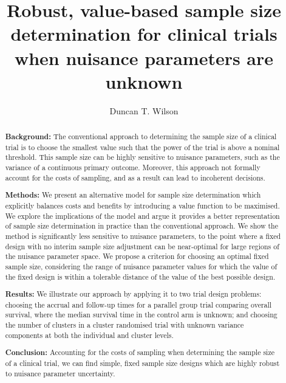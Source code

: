 \documentclass[sagev, Crown]{sagej}
\begin{document}

\title{Robust, value-based sample size determination for clinical trials when nuisance parameters are unknown}

\author{Duncan T. Wilson}%



\begin{abstract}

\textbf{Background:} The conventional approach to determining the sample size of a clinical trial is to choose the smallest value such that the power of the trial is above a nominal threshold. This sample size can be highly sensitive to nuisance parameters, such as the variance of a continuous primary outcome. Moreover, this approach not formally account for the costs of sampling, and as a result can lead to incoherent decisions.

\textbf{Methods:} We present an alternative model for sample size determination which explicitly balances costs and benefits by introducing a value function to be maximised. We explore the implications of the model and argue it provides a better representation of sample size determination in practice than the conventional approach. We show the method is significantly less sensitive to nuisance parameters, to the point where a fixed design with no interim sample size adjustment can be near-optimal for large regions of the nuisance parameter space. We propose a criterion for choosing an optimal fixed sample size, considering the range of nuisance parameter values for which the value of the fixed design is within a tolerable distance of the value of the best possible design.

\textbf{Results:} We illustrate our approach by applying it to two trial design problems: choosing the accrual and follow-up times for a parallel group trial comparing overall survival, where the median survival time in the control arm is unknown; and choosing the number of clusters in a cluster randomised trial with unknown variance components at both the individual and cluster levels.

\textbf{Conclusion:} Accounting for the costs of sampling when determining the sample size of a clinical trial,  we can find simple, fixed sample size designs which are highly robust to nuisance parameter uncertainty.
\end{abstract}
\end{document}
